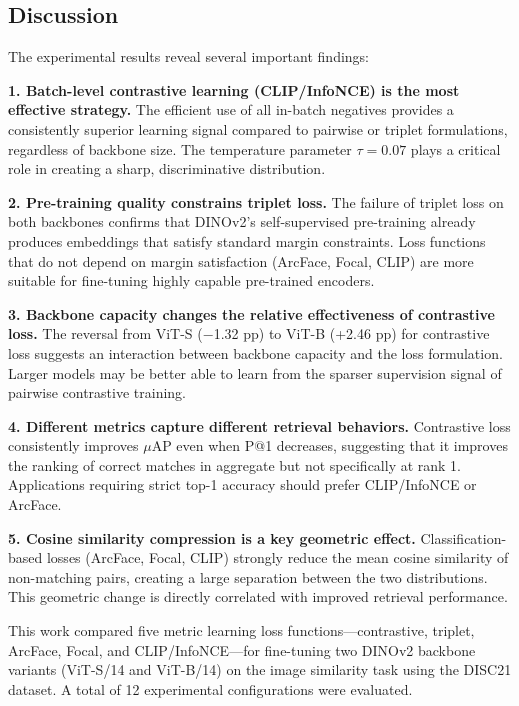 \documentclass[
    english,
]{VUMIFPSbakalaurinis}
\begin{document}
\subsection{Discussion}

The experimental results reveal several important findings:

\textbf{1. Batch-level contrastive learning (CLIP/InfoNCE) is the most effective strategy.} The efficient use of all in-batch negatives provides a consistently superior learning signal compared to pairwise or triplet formulations, regardless of backbone size. The temperature parameter $\tau = 0.07$ plays a critical role in creating a sharp, discriminative distribution.

\textbf{2. Pre-training quality constrains triplet loss.} The failure of triplet loss on both backbones confirms that DINOv2's self-supervised pre-training already produces embeddings that satisfy standard margin constraints. Loss functions that do not depend on margin satisfaction (ArcFace, Focal, CLIP) are more suitable for fine-tuning highly capable pre-trained encoders.

\textbf{3. Backbone capacity changes the relative effectiveness of contrastive loss.} The reversal from ViT-S ($-$1.32 pp) to ViT-B (+2.46 pp) for contrastive loss suggests an interaction between backbone capacity and the loss formulation. Larger models may be better able to learn from the sparser supervision signal of pairwise contrastive training.

\textbf{4. Different metrics capture different retrieval behaviors.} Contrastive loss consistently improves $\mu$AP even when P@1 decreases, suggesting that it improves the ranking of correct matches in aggregate but not specifically at rank 1. Applications requiring strict top-1 accuracy should prefer CLIP/InfoNCE or ArcFace.

\textbf{5. Cosine similarity compression is a key geometric effect.} Classification-based losses (ArcFace, Focal, CLIP) strongly reduce the mean cosine similarity of non-matching pairs, creating a large separation between the two distributions. This geometric change is directly correlated with improved retrieval performance.


This work compared five metric learning loss functions—contrastive, triplet, ArcFace, Focal, and CLIP/InfoNCE—for fine-tuning two DINOv2 backbone variants (ViT-S/14 and ViT-B/14) on the image similarity task using the DISC21 dataset. A total of 12 experimental configurations were evaluated.
\end{document}
